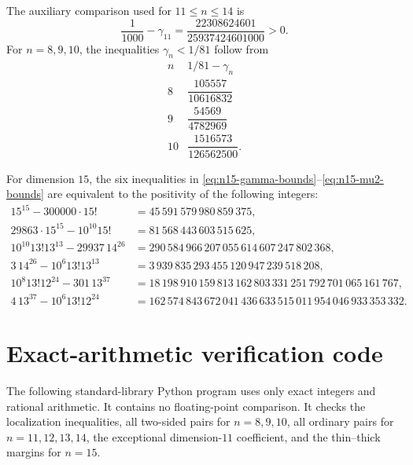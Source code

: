\documentclass[11pt]{article}
\theoremstyle{definition}
\newcommand{\1}{\mathbf{1}}
\begin{document}
The auxiliary comparison used for $11\le n\le14$ is
\[
 \frac1{1000}-\gamma_{11}
 =\frac{22308624601}{25937424601000}>0.
 \tag{A.2}\label{eq:gamma11-small}
\]
For $n=8,9,10$, the inequalities $\gamma_n<1/81$ follow from
\[
\begin{array}{c|c}
 n&1/81-\gamma_n\\ \hline
 8&\dfrac{105557}{10616832}\\[2mm]
 9&\dfrac{54569}{4782969}\\[2mm]
 10&\dfrac{1516573}{126562500}.
\end{array}
\tag{A.3}\label{eq:gamma-low-small}
\]

For dimension $15$, the six inequalities in \eqref{eq:n15-gamma-bounds}--\eqref{eq:n15-mu2-bounds} are equivalent to the positivity of the following integers:
\[
\begin{aligned}
15^{15}-300000\cdot15!
 &=45\,591\,579\,980\,859\,375,\\
29863\cdot15^{15}-10^{10}15!
 &=81\,568\,443\,603\,515\,625,\\
10^{10}13!13^{13}-29937\,14^{26}
 &=290\,584\,966\,207\,055\,614\,607\,247\,802\,368,\\
3\,14^{26}-10^6 13!13^{13}
 &=3\,939\,835\,293\,455\,120\,947\,239\,518\,208,\\
10^8 13!12^{24}-301\,13^{37}
 &=18\,198\,910\,159\,813\,162\,803\,331\,251\,792\,701\,065\,161\,767,\\
4\,13^{37}-10^6 13!12^{24}
 &=162\,574\,843\,672\,041\,436\,633\,515\,011\,954\,046\,933\,353\,332.
\end{aligned}
\tag{A.4}\label{eq:n15-integers}
\]

\section{Exact-arithmetic verification code}\label{app:code}

The following standard-library Python program uses only exact integers and rational arithmetic.  It contains no floating-point comparison.  It checks the localization inequalities, all two-sided pairs for $n=8,9,10$, all ordinary pairs for $n=11,12,13,14$, the exceptional dimension-$11$ coefficient, and the thin--thick margins for $n=15$.
\end{document}
